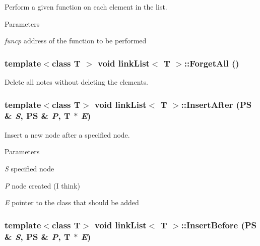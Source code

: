 Perform a given function on each element in the list. 
\begin{DoxyParams}{Parameters}
\item[{\em funcp}]address of the function to be performed \end{DoxyParams}
\hypertarget{classlink_list_a8005163404c8378ebb3b34d0e21da338}{
\subsubsection[{ForgetAll}]{\setlength{\rightskip}{0pt plus 5cm}template$<$class T $>$ void {\bf linkList}$<$ T $>$::ForgetAll ()}}
\label{classlink_list_a8005163404c8378ebb3b34d0e21da338}


Delete all notes without deleting the elements. \hypertarget{classlink_list_a098f769c818a9a5f5b9946861bd7199e}{
\subsubsection[{InsertAfter}]{\setlength{\rightskip}{0pt plus 5cm}template$<$class T$>$ void {\bf linkList}$<$ T $>$::InsertAfter ({\bf PS} \& {\em S}, \/  {\bf PS} \& {\em P}, \/  T $\ast$ {\em E})}}
\label{classlink_list_a098f769c818a9a5f5b9946861bd7199e}


Insert a new node after a specified node. 
\begin{DoxyParams}{Parameters}
\item[{\em S}]specified node \item[{\em P}]node created (I think) \item[{\em E}]pointer to the class that should be added \end{DoxyParams}
\hypertarget{classlink_list_a1084a4290ce03f2d192ba834a9bfb624}{
\subsubsection[{InsertBefore}]{\setlength{\rightskip}{0pt plus 5cm}template$<$class T$>$ void {\bf linkList}$<$ T $>$::InsertBefore ({\bf PS} \& {\em S}, \/  {\bf PS} \& {\em P}, \/  T $\ast$ {\em E})}}
\label{classlink_list_a1084a4290ce03f2d192ba834a9bfb624}


